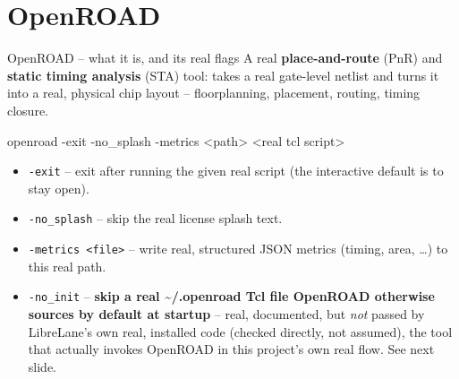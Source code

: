 \documentclass[aspectratio=169]{beamer}
\begin{document}
\section{OpenROAD}
\begin{frame}[fragile]{OpenROAD -- what it is, and its real flags}
A real \textbf{place-and-route} (PnR) and \textbf{static timing
analysis} (STA) tool: takes a real gate-level netlist and turns it
into a real, physical chip layout -- floorplanning, placement,
routing, timing closure.
\begin{cli}
openroad -exit -no_splash -metrics <path> <real tcl script>
\end{cli}
\begin{itemize}
  \item \texttt{-exit} -- exit after running the given real script
        (the interactive default is to stay open).
  \item \texttt{-no\_splash} -- skip the real license splash text.
  \item \texttt{-metrics <file>} -- write real, structured JSON
        metrics (timing, area, \dots) to this real path.
  \item \texttt{-no\_init} -- \textbf{skip a real
        \textasciitilde/.openroad Tcl file OpenROAD otherwise sources
        by default at startup} -- real, documented, but \emph{not}
        passed by LibreLane's own real, installed code (checked
        directly, not assumed), the tool that actually invokes
        OpenROAD in this project's own real flow. See next slide.
\end{itemize}
\end{frame}

\end{document}
